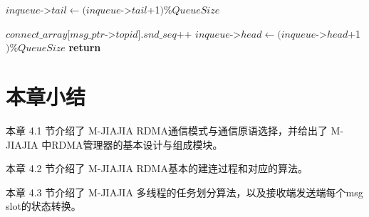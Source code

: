 {\begin{algorithm}
\begin{algorithmic}[1]
            \State
            \State {}
            \State {}
            \State {}
            \State $inqueue$->$tail \gets (inqueue$->$tail$+1$) \%QueueSize$
            \Else
            \EndWhile
            \EndIf

            \State
            \State $connect\_array[msg\_ptr$->$topid].snd\_seq$++
            \State $inqueue$->$head \gets (inqueue$->$head$+1$) \% QueueSize$
            \State {}
            \EndWhile
            \State \textbf{return}
            \EndProcedure
        \end{algorithmic}
    \end{algorithm}









    \section{本章小结}
    本章 4.1 节介绍了 M-JIAJIA RDMA通信模式与通信原语选择，并给出了 M-JIAJIA 中RDMA管理器的基本设计与组成模块。

    本章 4.2 节介绍了 M-JIAJIA RDMA基本的建连过程和对应的算法。

    本章 4.3 节介绍了 M-JIAJIA 多线程的任务划分算法，以及接收端发送端每个msg slot的状态转换。
}